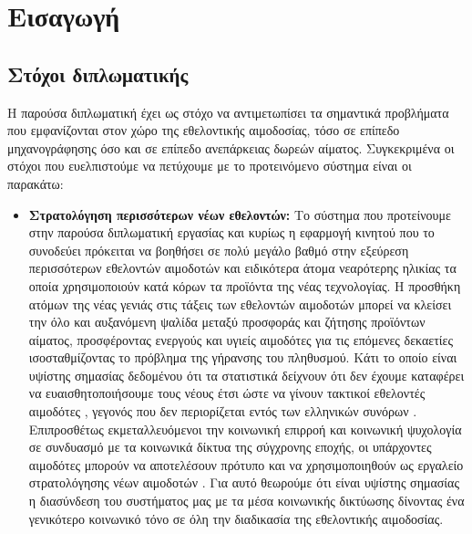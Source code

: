 \chapter{Εισαγωγή}\label{ch:intro}
\section{Στόχοι διπλωματικής}
Η παρούσα διπλωματική έχει ως στόχο να αντιμετωπίσει τα σημαντικά προβλήματα που εμφανίζονται στον χώρο της εθελοντικής αιμοδοσίας, τόσο σε επίπεδο μηχανογράφησης όσο και σε επίπεδο ανεπάρκειας δωρεών αίματος. Συγκεκριμένα οι στόχοι που ευελπιστούμε να πετύχουμε με το προτεινόμενο σύστημα είναι οι παρακάτω:
\begin{itemize}
	\item \textbf{Στρατολόγηση περισσότερων νέων εθελοντών:} Το σύστημα που προτείνουμε στην παρούσα διπλωματική εργασίας και κυρίως η εφαρμογή κινητού που το συνοδεύει πρόκειται να βοηθήσει σε πολύ μεγάλο βαθμό στην εξεύρεση περισσότερων εθελοντών αιμοδοτών και ειδικότερα άτομα νεαρότερης ηλικίας τα οποία χρησιμοποιούν κατά κόρων τα προϊόντα της νέας τεχνολογίας. Η προσθήκη ατόμων της νέας γενιάς στις τάξεις των εθελοντών αιμοδοτών μπορεί να κλείσει την όλο και αυξανόμενη ψαλίδα μεταξύ προσφοράς και ζήτησης προϊόντων αίματος, προσφέροντας ενεργούς και υγιείς αιμοδότες για τις επόμενες δεκαετίες ισοσταθμίζοντας το πρόβλημα της γήρανσης του πληθυσμού. Κάτι το οποίο είναι υψίστης σημασίας δεδομένου ότι τα στατιστικά δείχνουν ότι δεν έχουμε καταφέρει να ευαισθητοποιήσουμε τους νέους έτσι ώστε να γίνουν τακτικοί εθελοντές αιμοδότες \cite{Marantidou2007}, γεγονός που δεν περιορίζεται εντός των ελληνικών συνόρων \cite{Lemmens2005}. Επιπροσθέτως εκμεταλλευόμενοι την κοινωνική επιρροή και κοινωνική ψυχολογία σε συνδυασμό με τα κοινωνικά δίκτυα της σύγχρονης εποχής, οι υπάρχοντες αιμοδότες μπορούν να αποτελέσουν πρότυπο και να χρησιμοποιηθούν ως εργαλείο στρατολόγησης νέων αιμοδοτών \cite{Misje2005}. Για αυτό θεωρούμε ότι είναι υψίστης σημασίας η διασύνδεση του συστήματος μας με τα μέσα κοινωνικής δικτύωσης δίνοντας ένα γενικότερο κοινωνικό τόνο σε όλη την διαδικασία της εθελοντικής αιμοδοσίας.

\end{itemize}
